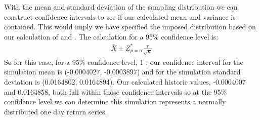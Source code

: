 \documentclass[letterpaper,10pt,english]{sphinxmanual}
\begin{document}
%
\begin{sphinxVerbatim}[commandchars=\\\{\}]
  \PYG{p}{[}    \PYG{p}{]}
    
 
 
 
\end{sphinxVerbatim}

With the mean and standard deviation of the sampling distribution we can
construct confidence intervals to see if our calculated mean and
variance is contained. This would imply we have specified the imposed
distribution based on our calculation of  and
. The calculation for a 95\% confidence level is:
\begin{equation*}
\begin{split}\bar{X} \pm Z^{*}_{p=\alpha} \frac{s}{\sqrt{n}}\end{split}
\end{equation*}
So for this case, for a 95\% confidence level, 1-\alpha, our
confidence interval for the simulation mean is (-0.0004027, -0.0003897)
and for the simulation standard deviation is (0.0164802, 0.0164894). Our
calculated historic values, -0.0004007 and 0.0164858, both fall within
those confidence intervals so at the 95\% confidence level we can
determine this simulation represents a normally distributed one day
return series.
\end{document}
